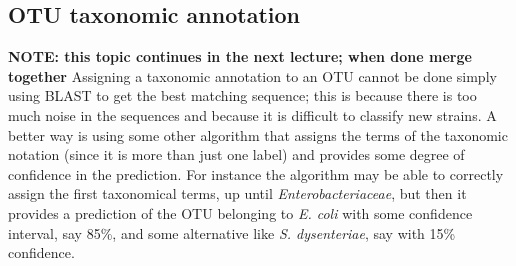   \subsection{OTU taxonomic annotation}
    \textbf{NOTE: this topic continues in the next lecture; when done merge together}
    Assigning a taxonomic annotation to an OTU cannot be done simply using BLAST to get the best matching sequence; this is because there is too much noise in the sequences and because it is difficult to classify new strains. A better way is using some other algorithm that assigns the terms of the taxonomic notation (since it is more than just one label) and provides some degree of confidence in the prediction. For instance the algorithm may be able to correctly assign the first taxonomical terms, up until \textit{Enterobacteriaceae}, but then it provides a prediction of the OTU belonging to \textit{E. coli} with some confidence interval, say 85\%, and some alternative like \textit{S. dysenteriae}, say with 15\% confidence.
